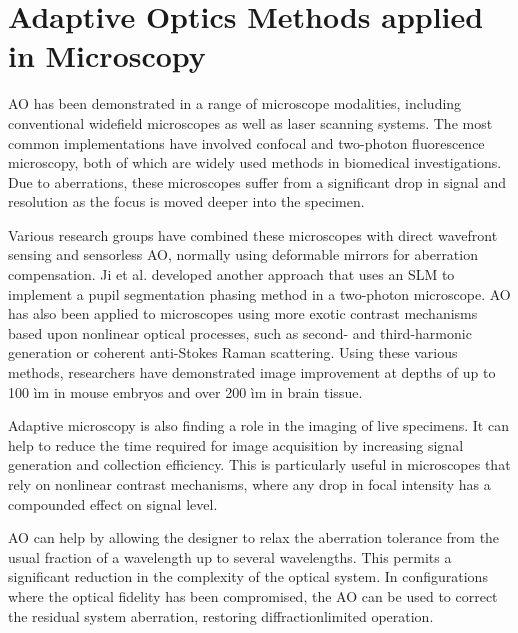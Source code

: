 
\section{Adaptive Optics Methods applied in Microscopy}
\label{sec:ExperimentDiscussion}

AO has been demonstrated in a range of microscope modalities, including 
conventional widefield microscopes as well as laser scanning systems. The 
most common implementations have involved confocal and two-photon 
fluorescence microscopy, both of which are widely used methods in biomedical 
investigations. Due to aberrations, these microscopes suffer from a 
significant drop in signal and resolution as the focus is moved deeper into 
the specimen. 

Various research groups have combined these microscopes with direct wavefront 
sensing and sensorless AO, normally using deformable mirrors for aberration 
compensation. Ji et al. developed another approach that uses an SLM to 
implement a pupil segmentation phasing method in a two-photon microscope. AO 
has also been applied to microscopes using more exotic contrast mechanisms 
based upon nonlinear optical processes, such as second- and third-harmonic 
generation or coherent anti-Stokes Raman scattering. Using these various 
methods, researchers have demonstrated image improvement at depths of up to 
100 ìm in mouse embryos and over 200 ìm in brain tissue.

Adaptive microscopy is also finding a role in the imaging of live specimens. 
It can help to reduce the time required for image acquisition by increasing 
signal generation and collection efficiency. This is particularly useful in 
microscopes that rely on nonlinear contrast mechanisms, where any drop in 
focal intensity has a compounded effect on signal level.

AO can help by allowing the designer to relax the aberration tolerance from 
the usual fraction of a wavelength up to several wavelengths. This permits a 
significant reduction in the complexity of the optical system. In 
configurations where the optical fidelity has been compromised, the AO can be 
used to correct the residual system aberration, restoring diffractionlimited 
operation.

